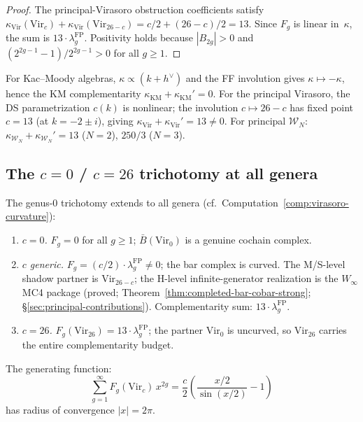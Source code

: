 \begin{proof}
The principal-Virasoro obstruction coefficients satisfy
$\kappa_{\mathrm{Vir}}(\mathrm{Vir}_c)
+ \kappa_{\mathrm{Vir}}(\mathrm{Vir}_{26-c})
= c/2 + (26-c)/2 = 13$.
Since $F_g$ is linear in~$\kappa$, the sum is
$13 \cdot \lambda_g^{\mathrm{FP}}$. Positivity holds because
$|B_{2g}| > 0$ and
$(2^{2g-1}-1)/2^{2g-1} > 0$ for all $g \geq 1$.
\end{proof}

\begin{remark}\label{rem:vir-vs-km-complementarity}
For Kac--Moody algebras, $\kappa \propto (k + h^\vee)$
and the FF involution gives $\kappa \mapsto -\kappa$, hence
the KM complementarity
$\kappa_{\mathrm{KM}} + \kappa_{\mathrm{KM}}' = 0$.
For the principal Virasoro, the DS parametrization $c(k)$ is
nonlinear; the involution $c \mapsto 26 - c$ has fixed point
$c = 13$ (at $k = -2 \pm i$), giving
$\kappa_{\mathrm{Vir}} + \kappa_{\mathrm{Vir}}' = 13 \neq 0$.
For principal $\mathcal{W}_N$:
$\kappa_{\mathcal{W}_N} + \kappa_{\mathcal{W}_N}' = 13$
($N=2$), $250/3$ ($N=3$).
\end{remark}

\subsection{\texorpdfstring{The $c = 0$ / $c = 26$ trichotomy at all genera}{The c = 0 / c = 26 trichotomy at all genera}}\label{subsec:vir-trichotomy}

\begin{remark}\label{rem:vir-trichotomy-genera}

The genus-0 trichotomy extends to all genera (cf.\ Computation~\ref{comp:virasoro-curvature}):
\begin{enumerate}
\item \emph{$c = 0$.} $F_g = 0$ for all $g \geq 1$; $\bar{B}(\mathrm{Vir}_0)$ is a genuine cochain complex.
\item \emph{$c$ generic.} $F_g = (c/2) \cdot \lambda_g^{\mathrm{FP}} \neq 0$; the bar complex is curved. The M/S-level shadow partner is $\mathrm{Vir}_{26-c}$; the H-level infinite-generator realization is the $W_\infty$ MC4 package (proved; Theorem~\ref{thm:completed-bar-cobar-strong}; \S\ref{sec:principal-contributions}). Complementarity sum: $13 \cdot \lambda_g^{\mathrm{FP}}$.
\item \emph{$c = 26$.} $F_g(\mathrm{Vir}_{26}) = 13 \cdot \lambda_g^{\mathrm{FP}}$; the partner $\mathrm{Vir}_0$ is uncurved, so $\mathrm{Vir}_{26}$ carries the entire complementarity budget.
\end{enumerate}
The generating function:
\begin{equation}\label{eq:vir-generating}
\sum_{g=1}^{\infty} F_g(\mathrm{Vir}_c)\, x^{2g} = \frac{c}{2}\left(\frac{x/2}{\sin(x/2)} - 1\right)
\end{equation}
has radius of convergence $|x| = 2\pi$.
\end{remark}

